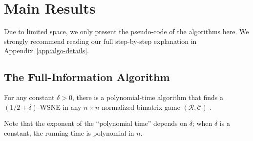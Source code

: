 \section{Main Results}

Due to limited space, we only present the pseudo-code of the algorithms here. We strongly recommend reading our full step-by-step explanation in Appendix~\ref{app:algo-details}.

\subsection{The Full-Information Algorithm}

\begin{theorem}
  \label{thm:finding-bimat-game-12_del-wsne-is-poly-time}
  For any constant \(\delta > 0\), there is a polynomial-time algorithm that finds a \((1/2 + \delta)\)-WSNE in any \(n \times n\) normalized bimatrix game \((\mathcal{R}, \mathcal{C})\) \cite[Theorem~1]{12WSNE}.
\end{theorem}

Note that the exponent of the ``polynomial time'' depends on \(\delta\); when \(\delta\) is a constant, the running time is polynomial in \(n\).

